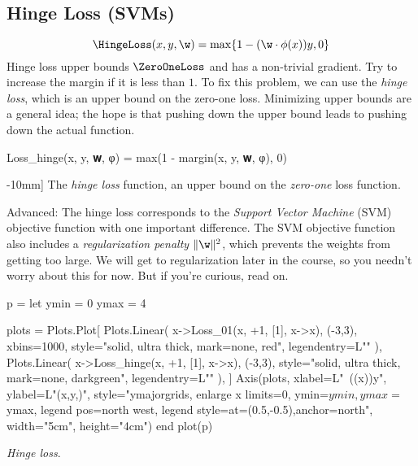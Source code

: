 
\subsection{Hinge Loss (SVMs)} %
\label{sub:hinge_loss}
\[
    \HingeLoss(x, y, \w) = \max\{1 - (\w \cdot \phi(x)) y, 0 \}
\]
Hinge loss upper bounds $\ZeroOneLoss$ and has a non-trivial gradient. Try to increase the margin if it is less than $1$.
% 
To fix this problem, we can use the \textit{hinge loss}, which is an upper bound on the zero-one loss.
Minimizing upper bounds are a general idea; the hope is that pushing down the upper bound leads
to pushing down the actual function.
\begin{algorithm}
\begin{juliaverbatim}
Loss_hinge(x, y, 𝐰, φ) = max(1 - margin(x, y, 𝐰, φ), 0)
\end{juliaverbatim}
\caption[][-10mm]{
    \label{alg:hinge_loss}
    The \textit{hinge loss} function, an upper bound on the \textit{zero-one} loss function.
}
\end{algorithm}

Advanced: The hinge loss corresponds to the \textit{Support Vector Machine} (SVM) objective function with one important difference.
The SVM objective function also includes a \textit{regularization penalty} $\|\w\|^2$, which prevents the weights from getting too large.
We will get to regularization later in the course, so you needn't worry about this for now.
But if you're curious, read on.
\begin{marginfigure}
  \begin{jlcode}
    p = let
        ymin = 0
        ymax = 4

        plots = Plots.Plot[
            Plots.Linear(
                x->Loss_01(x, +1, [1], x->x), (-3,3), xbins=1000, style="solid, ultra thick, mark=none, red", legendentry=L"\ZeroOneLoss"
            ),
            Plots.Linear(
                x->Loss_hinge(x, +1, [1], x->x), (-3,3), style="solid, ultra thick, mark=none, darkgreen", legendentry=L"\HingeLoss"
            ),
        ]
        Axis(plots,
             xlabel=L"~(\cdot\phi(x))y",
             ylabel=L"\Loss(x,y,)",
             style="ymajorgrids, enlarge x limits=0, ymin=$ymin, ymax=$ymax, legend pos=north west, legend style={at={(0.5,-0.5)},anchor=north}",
             width="5cm", height="4cm")
    end
    plot(p)
  \end{jlcode}
  \begin{center}
  \end{center}
  \caption{
    \label{fig:hinge_loss} \textit{Hinge loss}.
  }
\end{marginfigure}

